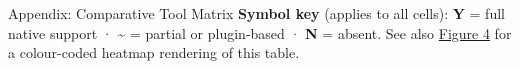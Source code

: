 \documentclass[
  ignorenonframetext,
]{beamer}
\author{\texorpdfstring{}{}}
\date{}
\begin{document}
\begin{frame}
\newpage
\end{frame}

\begin{frame}{Appendix: Comparative Tool
Matrix}
\protect{}\label{appendix-matrix}
\textbf{Symbol key} (applies to all cells): \textbf{Y} = full native
support · \textbf{\textasciitilde{}} = partial or plugin-based ·
\textbf{N} = absent. See also
\href{04_results.md\#comparative-feature-analysis}{Figure 4} for a
colour-coded heatmap rendering of this table.

\begin{table}[h]
\caption{Comparative feature matrix (14 capabilities $\times$ 10 tools). Y~=~full native support, \textasciitilde~=~partial or plugin-based, N~=~absent.}
\label{tab:comparative-matrix}
\end{table}


\end{frame}
\end{document}
